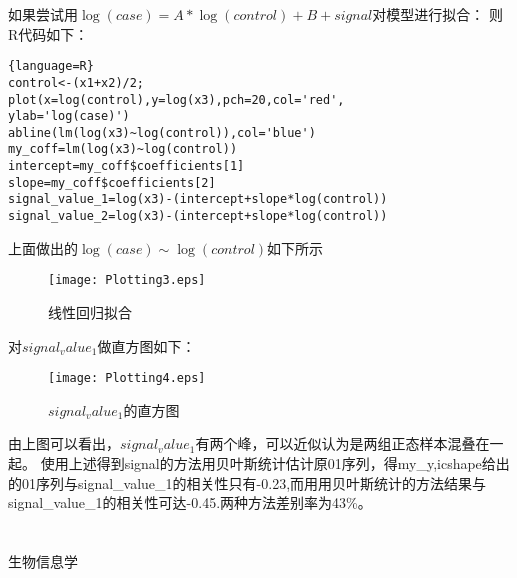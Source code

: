 \documentclass[12pt]{article}
\begin{document}
如果尝试用$\log(case)=A*\log(control)+B+signal$对模型进行拟合：
则R代码如下：
\begin{lstlisting}{language=R}
control<-(x1+x2)/2;
plot(x=log(control),y=log(x3),pch=20,col='red',
ylab='log(case)')
abline(lm(log(x3)~log(control)),col='blue')
my_coff=lm(log(x3)~log(control))
intercept=my_coff$coefficients[1]
slope=my_coff$coefficients[2]
signal_value_1=log(x3)-(intercept+slope*log(control))
signal_value_2=log(x3)-(intercept+slope*log(control))
\end{lstlisting}
上面做出的$\log(case) \sim \log(control)$如下所示
\begin{figure}[!ht]
\centering
\caption{线性回归拟合}
\texttt{[image: Plotting3.eps]}
\end{figure}

\newpage
对$signal_value_1$做直方图如下：
\begin{figure}[!ht]
\centering
\caption{$signal_value_1$的直方图}
\texttt{[image: Plotting4.eps]}
\end{figure}


由上图可以看出，$signal_value_1$有两个峰，可以近似认为是两组正态样本混叠在一起。
使用上述得到signal的方法用贝叶斯统计估计原01序列，得my\_y,icshape给出的01序列与signal\_value\_1的相关性只有-0.23,而用用贝叶斯统计的方法结果与signal\_value\_1的相关性可达-0.45.两种方法差别率为43\%。




\section{\textbf{}}
\begin{thebibliography}{}
 生物信息学
 
\end{thebibliography}
\end{document}
